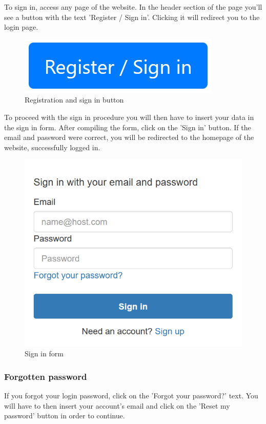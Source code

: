 To sign in, access any page of the website. In the header section of the page you'll see a button with the text 'Register / Sign in'. Clicking it will redirect you to the login page.

\begin{figure}[H]
\centering
\includegraphics[scale=0.6]{res/Immagini/RegisterSigninButton}
\caption{Registration and sign in button}
\end{figure}

To proceed with the sign in procedure you will then have to insert your data in the sign in form. After compiling the form, click on the 'Sign in' button. If the email and password were correct, you will be redirected to the homepage of the website, successfully logged in.

\begin{figure}[H]
\centering
\includegraphics[scale=0.6]{res/Immagini/SigninForm}
\caption{Sign in form}
\end{figure}

\subsubsection{Forgotten password}
If you forgot your login password, click on the 'Forgot your password?' text. You will have to then insert your account's email and click on the 'Reset my password' button in order to continue.


